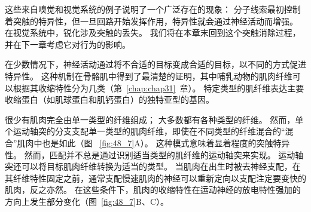 这些来自嗅觉和视觉系统的例子说明了一个广泛存在的现象：
分子线索最初控制着突触的特异性，但一旦回路开始发挥作用，特异性就会通过神经活动而增强。
在视觉系统中，锐化涉及突触的丢失。
我们将在本章末回到这个突触消除过程，并在下一章考虑它对行为的影响。


在少数情况下，神经活动通过将不合适的目标变成合适的目标，以不同的方式促进特异性。
这种机制在骨骼肌中得到了最清楚的证明，其中哺乳动物的肌肉纤维可以根据其收缩特性分为几类（第~\ref{chap:chap31}~章）。
特定类型的肌纤维表达主要收缩蛋白（如肌球蛋白和肌钙蛋白）的独特亚型的基因。


很少有肌肉完全由单一类型的纤维组成； 大多数都有各种类型的纤维。
然而，单个运动轴突的分支支配单一类型的肌肉纤维，即使在不同类型的纤维混合的“混合”肌肉中也是如此（图 ~\ref{fig:48_7}A）。
这种模式意味着显着程度的突触特异性。
然而，匹配并不总是通过识别适当类型的肌纤维的运动轴突来实现。
运动轴突还可以将目标肌肉纤维转换为适当的类型。
当肌肉在出生时被去神经支配，在其纤维特性固定之前，通常支配慢速肌肉的神经可以重新定向以支配注定要变快的肌肉，反之亦然。
在这些条件下，肌肉的收缩特性在运动神经的放电特性强加的方向上发生部分变化（图~\ref{fig:48_7}B、C）。



